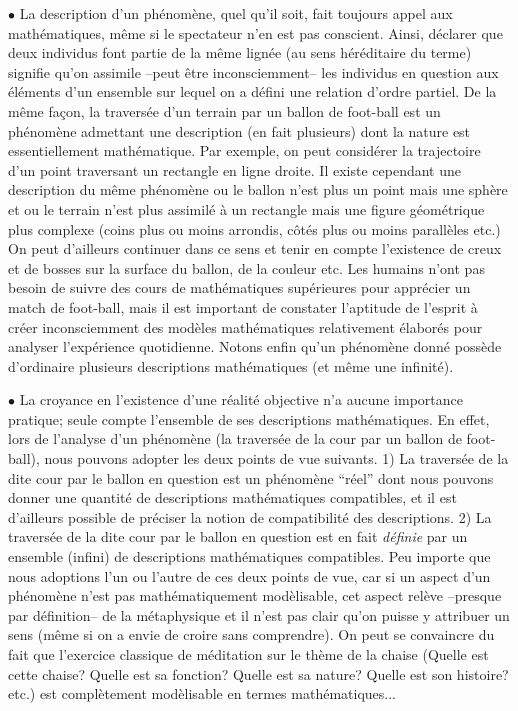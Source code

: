 $\bullet$ La description d'un ph\'enom\`ene, quel qu'il soit,
fait toujours appel aux math\'ematiques, m\^eme si le spectateur n'en est
pas conscient. Ainsi, d\'eclarer que deux individus font
partie de la m\^eme lign\'ee (au sens h\'er\'editaire du terme)
signifie qu'on assimile --peut \^etre inconsciemment-- les
individus en question aux \'el\'ements d'un ensemble sur
lequel on a d\'efini une  relation d'ordre partiel.
De la m\^eme fa\c con, la travers\'ee d'un terrain par un ballon
de foot-ball est un ph\'enom\`ene admettant une description
(en fait plusieurs) dont la nature est essentiellement
math\'ematique. Par exemple, on peut consid\'erer la
trajectoire d'un point traversant un rectangle en ligne
droite. Il existe cependant une description du m\^eme
ph\'enom\`ene ou le ballon n'est plus un point mais une sph\`ere
et ou le terrain n'est plus assimil\'e \`a un rectangle mais
une figure g\'eom\'etrique plus complexe (coins plus ou moins
arrondis, c\^ot\'es plus ou moins parall\`eles etc.) On peut
d'ailleurs continuer dans ce sens et tenir en compte
l'existence de creux et de bosses sur la surface du
ballon, de la couleur etc. Les humains n'ont pas besoin
de suivre des cours de math\'ematiques sup\'erieures pour
appr\'ecier un match de foot-ball, mais il est important de
constater l'aptitude de l'esprit \`a cr\'eer
inconsciemment des mod\`eles math\'ematiques relativement
\'elabor\'es pour analyser l'exp\'erience quotidienne. Notons
enfin qu'un ph\'enom\`ene donn\'e poss\`ede d'ordinaire plusieurs
descriptions math\'ematiques (et m\^eme une infinit\'e).\par

$\bullet$ La croyance en l'existence d'une r\'ealit\'e objective
n'a aucune importance pratique; seule compte
l'ensemble de ses descriptions math\'ematiques.
 En effet, lors de l'analyse d'un
ph\'enom\`ene (la travers\'ee de la cour par un ballon de
foot-ball), nous pouvons adopter les deux points de vue
suivants. 1) La travers\'ee de la dite cour par le ballon en
question est un ph\'enom\`ene ``r\'eel'' dont nous pouvons
donner une quantit\'e de descriptions math\'ematiques
compatibles, et il est d'ailleurs possible de pr\'eciser la notion de
compatibilit\'e des descriptions. 2) La travers\'ee de la
dite cour par le ballon en question est en fait {\sl
d\'efinie} par un ensemble (infini) de descriptions
math\'ematiques compatibles. Peu importe que nous adoptions
l'un ou l'autre de ces deux points de vue, car si un
aspect d'un ph\'enom\`ene n'est pas math\'ematiquement
mod\`elisable, cet aspect rel\`eve --presque par d\'efinition-- de la
m\'etaphysique et il n'est pas clair qu'on puisse y
attribuer un sens (m\^eme si on a envie de croire sans
comprendre). On peut se convaincre du fait que l'exercice classique
de m\'editation sur le th\`eme de la chaise (Quelle est
cette chaise? Quelle est sa fonction? Quelle est sa nature?
Quelle est son histoire? etc.) est compl\`etement
mod\`elisable en termes math\'ematiques...\par


